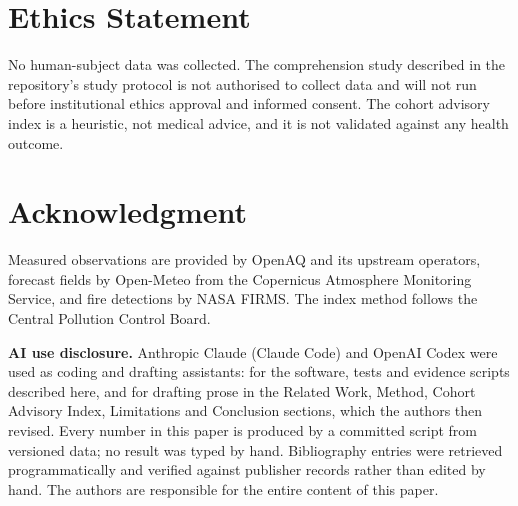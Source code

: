 \documentclass[conference]{IEEEtran}
\begin{document}
\section*{Ethics Statement}
No human-subject data was collected. The comprehension study described in the
repository's study protocol is not authorised to collect data and will not run
before institutional ethics approval and informed consent. The cohort advisory
index is a heuristic, not medical advice, and it is not validated against any
health outcome.

\section*{Acknowledgment}
Measured observations are provided by OpenAQ and its upstream operators,
forecast fields by Open-Meteo from the Copernicus Atmosphere Monitoring Service,
and fire detections by NASA FIRMS. The index method follows the Central
Pollution Control Board.

\textbf{AI use disclosure.} Anthropic Claude (Claude Code) and OpenAI Codex were
used as coding and drafting assistants: for the software, tests and evidence
scripts described here, and for drafting prose in the Related Work, Method,
Cohort Advisory Index, Limitations and Conclusion sections, which the authors
then revised. Every number in this paper is produced by a committed script from
versioned data; no result was typed by hand. Bibliography entries were retrieved
programmatically and verified against publisher records rather than edited by
hand. The authors are responsible for the entire content of this paper.



\end{document}
